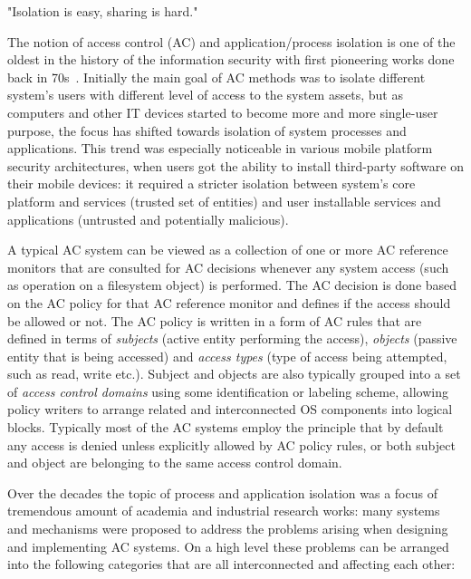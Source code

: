 \begin{quoting}
"Isolation is easy, sharing is hard."
\end{quoting}


The notion of access control (AC) and application/process isolation is one of the oldest in the history of the information security with first pioneering works done back in 70s~\cite{saltzer75, Denning76}. Initially the main goal of AC methods was to isolate different system's users with different level of access to the system assets, but as computers and other IT devices started to become more and more single-user purpose, the focus has shifted towards isolation of system processes and applications. This trend was especially noticeable in various mobile platform security architectures, when users got the ability to install third-party software on their mobile devices: it required a stricter isolation between system's core platform and services (trusted set of entities) and user installable services and applications (untrusted and potentially malicious).

A typical AC system can be viewed as a collection of one or more AC reference monitors that are consulted for AC decisions whenever any system access (such as operation on a filesystem object) is performed. The AC decision is done based on the AC policy for that AC reference monitor and defines if the access should be allowed or not. The AC policy is written in a form of AC rules that are defined in terms of \textit{subjects} (active entity performing the access), \textit{objects} (passive entity that is being accessed) and \textit{access types} (type of access being attempted, such as read, write etc.). Subject and objects are also typically grouped into a set of \textit{access control domains} using some identification or labeling scheme, allowing policy writers to arrange related and interconnected OS components into logical blocks. Typically most of the AC systems employ the principle that by default any access is denied unless explicitly allowed by AC policy rules, or both subject and object are belonging to the same access control domain.
 
Over the decades the topic of process and application isolation was a focus of tremendous amount of academia and industrial research works: many systems and mechanisms were proposed to address the problems arising when designing and implementing AC systems. On a high level these problems can be arranged into the following categories that are all interconnected and affecting each other: 

